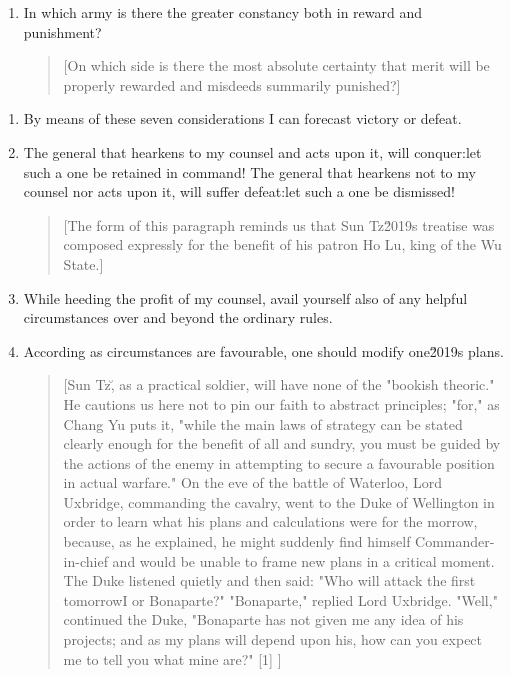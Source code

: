 \documentclass[10pt,a4paper]{book}
\begin{document}
\begin{enumerate}[leftmargin=*, label=\arabic*., resume]
\begin{enumerate}[label=(\arabic*), leftmargin=2em]
\item In which army is there the greater constancy both in reward and punishment?

{\small
\begin{quote}
[On which side is there the most absolute certainty that merit will be properly rewarded and misdeeds summarily punished?]
\end{quote}
}

\end{enumerate}

\end{enumerate}

\begin{enumerate}[leftmargin=*, label=\arabic*., resume]

\item By means of these seven considerations I can forecast victory or defeat.

\item The general that hearkens to my counsel and acts upon it, will conquer:\textemdash let such a one be retained in command! The general that hearkens not to my counsel nor acts upon it, will suffer defeat:\textemdash let such a one be dismissed!

{\small
\begin{quote}
[The form of this paragraph reminds us that Sun Tz\u2019s treatise was composed expressly for the benefit of his patron Ho Lu, king of the Wu State.]
\end{quote}
}

\item While heeding the profit of my counsel, avail yourself also of any helpful circumstances over and beyond the ordinary rules.

\item According as circumstances are favourable, one should modify one\u2019s plans.

{\small
\begin{quote}
[Sun Tz\u, as a practical soldier, will have none of the "bookish theoric." He cautions us here not to pin our faith to abstract principles; "for," as Chang Yu puts it, "while the main laws of strategy can be stated clearly enough for the benefit of all and sundry, you must be guided by the actions of the enemy in attempting to secure a favourable position in actual warfare." On the eve of the battle of Waterloo, Lord Uxbridge, commanding the cavalry, went to the Duke of Wellington in order to learn what his plans and calculations were for the morrow, because, as he explained, he might suddenly find himself Commander-in-chief and would be unable to frame new plans in a critical moment. The Duke listened quietly and then said: "Who will attack the first tomorrow\textemdash I or Bonaparte?" "Bonaparte," replied Lord Uxbridge. "Well," continued the Duke, "Bonaparte has not given me any idea of his projects; and as my plans will depend upon his, how can you expect me to tell you what mine are?" [1] ]
\end{quote}
}


\end{enumerate}
\end{document}
